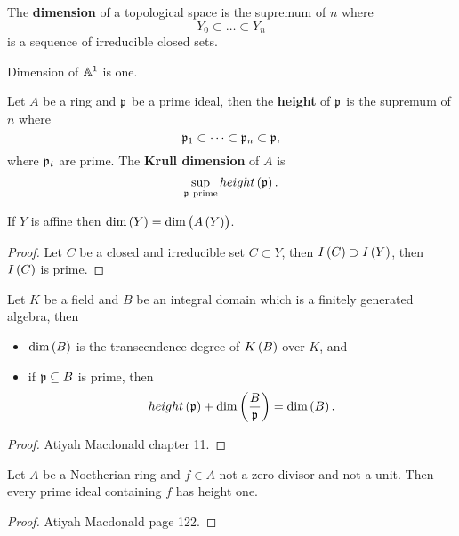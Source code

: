 \begin{definition}
The \textbf{dimension} of a topological space is the supremum of $ n $ where
$$ Y_0 \subset \dots \subset Y_n $$
is a sequence of irreducible closed sets.
\end{definition}

\begin{example}
Dimension of $ \mathbb{A}^1 $ is one.
\end{example}

\begin{definition}
Let $ A $ be a ring and $ \mathfrak{p} $ be a prime ideal, then the \textbf{height} of $ \mathfrak{p} $ is the supremum of $ n $ where
$$ \mathfrak{p}_1 \subset \dots \subset \mathfrak{p}_n \subset \mathfrak{p}, $$
where $ \mathfrak{p}_i $ are prime. The \textbf{Krull dimension} of $ A $ is
$$ \sup_{\pp \ \text{prime}} height\br{\pp}. $$
\end{definition}

\begin{proposition}
If $ Y $ is affine then $ \dim\br{Y} = \dim\br{A\br{Y}} $.
\end{proposition}

\begin{proof}
Let $ C $ be a closed and irreducible set $ C \subset Y $, then $ I\br{C} \supset I\br{Y} $, then $ I\br{C} $ is prime.
\end{proof}

\begin{proposition}
Let $ K $ be a field and $ B $ be an integral domain which is a finitely generated algebra, then
\begin{itemize}
\item $ \dim\br{B} $ is the transcendence degree of $ K\br{B} $ over $ K $, and
\item if $ \mathfrak{p} \subseteq B $ is prime, then
$$ height\br{\pp} + \dim\br{\dfrac{B}{\pp}} = \dim\br{B}. $$
\end{itemize}
\end{proposition}

\begin{proof}
Atiyah Macdonald chapter 11.
\end{proof}

\begin{proposition}
Let $ A $ be a Noetherian ring and $ f \in A $ not a zero divisor and not a unit. Then every prime ideal containing $ f $ has height one.
\end{proposition}

\begin{proof}
Atiyah Macdonald page 122.
\end{proof}

